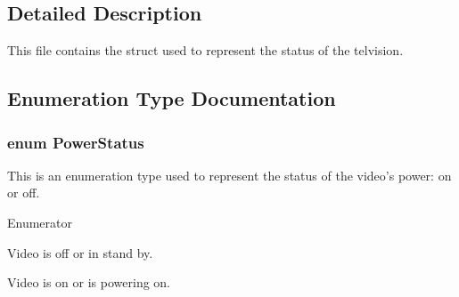 \subsection{Detailed Description}
This file contains the struct used to represent the status of the telvision. 



\subsection{Enumeration Type Documentation}
\hypertarget{television__status_8hh_a65e6bb4d942c22dba9975253b0a1d73f}{
\subsubsection[{Power\+Status}]{\setlength{\rightskip}{0pt plus 5cm}enum {\bf Power\+Status}}}\label{television__status_8hh_a65e6bb4d942c22dba9975253b0a1d73f}
This is an enumeration type used to represent the status of the video's power\+: on or off. \begin{Desc}
\item[Enumerator]\par
\begin{description}
\item[{\em 
\hypertarget{television__status_8hh_a65e6bb4d942c22dba9975253b0a1d73fa53ace14c115e45153a1c9105accceb4c}{off}\label{television__status_8hh_a65e6bb4d942c22dba9975253b0a1d73fa53ace14c115e45153a1c9105accceb4c}
}]Video is off or in stand by. \item[{\em 
\hypertarget{television__status_8hh_a65e6bb4d942c22dba9975253b0a1d73faf3be4933da71233c5904ec919ac1fdb0}{on}\label{television__status_8hh_a65e6bb4d942c22dba9975253b0a1d73faf3be4933da71233c5904ec919ac1fdb0}
}]Video is on or is powering on. \end{description}
\end{Desc}
